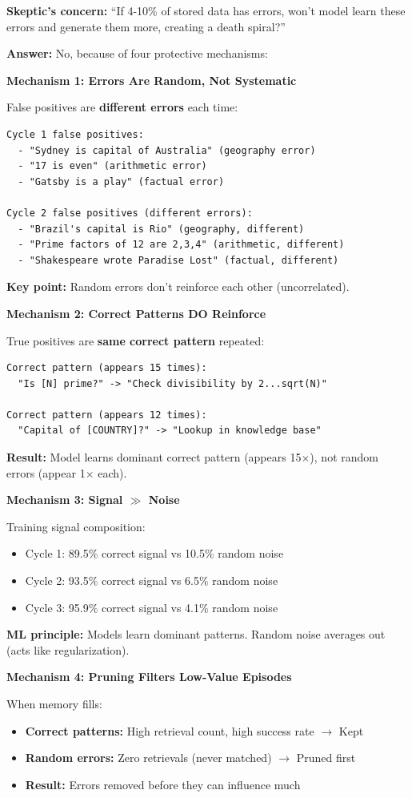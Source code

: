 \documentclass[12pt,a4paper]{article}
\theoremstyle{definition}
\begin{document}
\begin{whybox}
\textbf{Skeptic's concern:} ``If 4-10\% of stored data has errors, won't model learn these errors and generate them more, creating a death spiral?''

\textbf{Answer:} No, because of four protective mechanisms:

\textbf{Mechanism 1: Errors Are Random, Not Systematic}

False positives are \textbf{different errors} each time:
\begin{verbatim}
Cycle 1 false positives:
  - "Sydney is capital of Australia" (geography error)
  - "17 is even" (arithmetic error)
  - "Gatsby is a play" (factual error)

Cycle 2 false positives (different errors):
  - "Brazil's capital is Rio" (geography, different)
  - "Prime factors of 12 are 2,3,4" (arithmetic, different)
  - "Shakespeare wrote Paradise Lost" (factual, different)
\end{verbatim}

\textbf{Key point:} Random errors don't reinforce each other (uncorrelated).

\textbf{Mechanism 2: Correct Patterns DO Reinforce}

True positives are \textbf{same correct pattern} repeated:
\begin{verbatim}
Correct pattern (appears 15 times):
  "Is [N] prime?" -> "Check divisibility by 2...sqrt(N)"

Correct pattern (appears 12 times):
  "Capital of [COUNTRY]?" -> "Lookup in knowledge base"
\end{verbatim}

\textbf{Result:} Model learns dominant correct pattern (appears 15$\times$), not random errors (appear 1$\times$ each).

\textbf{Mechanism 3: Signal $\gg$ Noise}

Training signal composition:
\begin{itemize}
    \item Cycle 1: 89.5\% correct signal vs 10.5\% random noise
    \item Cycle 2: 93.5\% correct signal vs 6.5\% random noise
    \item Cycle 3: 95.9\% correct signal vs 4.1\% random noise
\end{itemize}

\textbf{ML principle:} Models learn dominant patterns. Random noise averages out (acts like regularization).

\textbf{Mechanism 4: Pruning Filters Low-Value Episodes}

When memory fills:
\begin{itemize}
    \item \textbf{Correct patterns:} High retrieval count, high success rate $\rightarrow$ Kept
    \item \textbf{Random errors:} Zero retrievals (never matched) $\rightarrow$ Pruned first
    \item \textbf{Result:} Errors removed before they can influence much
\end{itemize}
\end{whybox}
\end{document}
